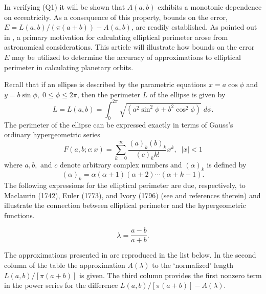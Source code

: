 \documentclass[12pt]{article}
\begin{document}
In verifying (Q1) it will be shown that $A(a,b)$ exhibits a monotonic 
dependence on eccentricity. As a
consequence of this  property,  bounds on the error, $E=L(a,b)/(\pi (a+b))-A(a,b)$, 
are readily
established.  As pointed out in \cite{AB}, a primary motivation for  
calculating  elliptical
perimeter arose from astronomical considerations. This
article will illustrate how
 bounds on the error $E$ may be utilized to determine the accuracy of  
 approximations to elliptical perimeter in calculating planetary orbits.

\vspace{18pt} 
\vspace{12pt}
  
Recall that  if an ellipse is described by the parametric equations
$x=a\cos\phi$ and $y=b\sin \phi, \; 0 \leq \phi \leq 2 \pi$, then  the 
perimeter $L$
of the ellipse  is given by
$$ 
 L=L(a,b)=\int_0^{2\pi} \sqrt{(a^2 \sin^2 \phi + b^2 \cos^2 \phi)} \; 
d\phi. 
$$  
The perimeter of the ellipse can be expressed exactly in terms of Gauss's 
ordinary hypergeometric series
$$ 
F(a,b; c: x) =\sum_{k=0}^{\infty} \frac {(a)_k (b)_k}{(c)_k k!} x^k, \;\; 
|x|<1
$$ 
where $a,b,$ and $c$ denote arbitrary complex numbers and $(\alpha)_k$ is
defined  by
$$
 (\alpha)_k= \alpha (\alpha +1) (\alpha +2) \cdots (\alpha +k-1).
$$
The following  expressions for the elliptical perimeter are due, respectively,  to
Maclaurin (1742), Euler (1773),  and Ivory (1796) (see \cite {AB} and 
references
therein) and  illustrate the  connection between elliptical perimeter and the 
hypergeometric functions.
 
\vspace{12pt}
$$
\lambda=\frac{a-b}{a+b}.
$$ 


The approximations presented in \cite{AB} are reproduced in the list 
below.  In the second column
of the table the approximation $ A(\lambda)$ to  the  `normalized' length 
$ L(a,b)/[\pi (a+b)]$ is
given.  The third column provides the first nonzero term in the power 
series for the difference 
$L(a,b)/[\pi (a+b)] - A(\lambda)$.
\end{document}
